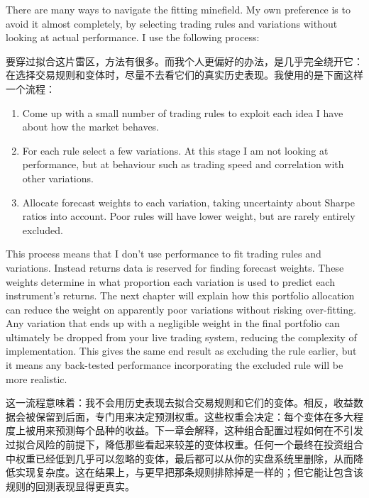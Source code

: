 
\begin{englishblock} There are many ways to navigate the fitting minefield. My own preference is to avoid it almost completely, by selecting trading rules and variations without looking at actual performance. I use the following process: \end{englishblock}

\begin{chineseblock}要穿过拟合这片雷区，方法有很多。而我个人更偏好的办法，是几乎完全绕开它：在选择交易规则和变体时，尽量不去看它们的真实历史表现。我使用的是下面这样一个流程：\end{chineseblock}

\begin{enumerate}
\item Come up with a small number of trading rules to exploit each idea I have about how the market behaves.
\item For each rule select a few variations. At this stage I am not looking at performance, but at behaviour such as trading speed and correlation with other variations.
\item Allocate forecast weights to each variation, taking uncertainty about Sharpe ratios into account. Poor rules will have lower weight, but are rarely entirely excluded. \end{enumerate}

\begin{englishblock} This process means that I don't use performance to fit trading rules and variations. Instead returns data is reserved for finding forecast weights. These weights determine in what proportion each variation is used to predict each instrument's returns. The next chapter will explain how this portfolio allocation can reduce the weight on apparently poor variations without risking over-fitting. Any variation that ends up with a negligible weight in the final portfolio can ultimately be dropped from your live trading system, reducing the complexity of implementation. This gives the same end result as excluding the rule earlier, but it means any back-tested performance incorporating the excluded rule will be more realistic. \end{englishblock}

\begin{chineseblock}这一流程意味着：我不会用历史表现去拟合交易规则和它们的变体。相反，收益数据会被保留到后面，专门用来决定预测权重。这些权重会决定：每个变体在多大程度上被用来预测每个品种的收益。下一章会解释，这种组合配置过程如何在不引发过拟合风险的前提下，降低那些看起来较差的变体权重。任何一个最终在投资组合中权重已经低到几乎可以忽略的变体，最后都可以从你的实盘系统里删除，从而降低实现复杂度。这在结果上，与更早把那条规则排除掉是一样的；但它能让包含该规则的回测表现显得更真实。\end{chineseblock}

